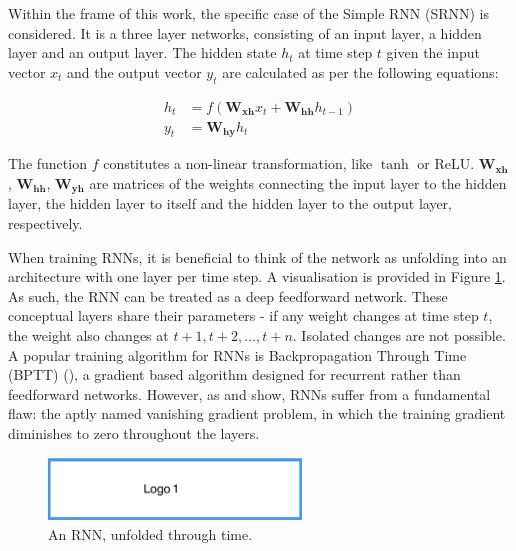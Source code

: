 Within the frame of this work, the specific case of the Simple RNN (SRNN) is considered. It is a three layer networks, consisting of an input layer, a hidden layer and an output layer. The hidden state $h_t$ at time step $t$ given the input vector $x_t$ and the output vector $y_t$ are calculated as per the following equations:

\begin{align}
	h_{t} &= f(\boldsymbol{W_{xh}} x_{t} + \boldsymbol{W_{hh}} h_{t-1}) \\
	y_{t} &= \boldsymbol{W_{hy}} h_{t}
\end{align}

The function $f$ constitutes a non-linear transformation, like $\tanh$ or ReLU. $\boldsymbol{W_{xh}}$, $\boldsymbol{W_{hh}}$, $\boldsymbol{W_{yh}}$ are matrices of the weights connecting the input layer to the hidden layer, the hidden layer to itself and the hidden layer to the output layer, respectively.

When training RNNs, it is beneficial to think of the network as unfolding into an architecture with one layer per time step. A visualisation is provided in Figure \ref{fig:unrolledRNN}. As such, the RNN can be treated as a deep feedforward network. These conceptual layers share their parameters - if any weight changes at time step $t$, the weight also changes at $t+1, t+2, \dots, t+n$. Isolated changes are not possible. A popular training algorithm for RNNs is Backpropagation Through Time (BPTT) (\cite{Williams1998}), a gradient based algorithm designed for recurrent rather than feedforward networks. However, as \cite{Bengio1994} and \cite{Hochreiter1998} show, RNNs suffer from a fundamental flaw: the aptly named vanishing gradient problem, in which the training gradient diminishes to zero throughout the layers.

\begin{figure}[htb]
 \centering
 \includegraphics[width=0.6\textwidth]{abb/logo1}
 \caption[Unfolded RNN]{An RNN, unfolded through time.}
\label{fig:unrolledRNN}
\end{figure}


